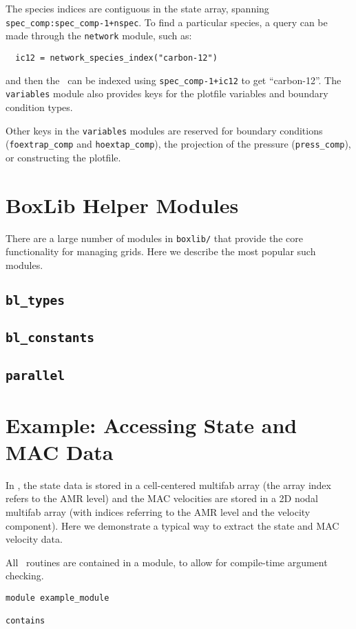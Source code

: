 The species indices are contiguous in the state array, spanning {\tt
  spec\_comp:spec\_comp-1+nspec}.  To find a particular species, a
query can be made through the {\tt network} module, such as:
\begin{verbatim}
  ic12 = network_species_index("carbon-12")
\end{verbatim}
and then the \fab\ can be indexed using {\tt spec\_comp-1+ic12} to
get ``carbon-12''.
The {\tt variables} module also provides keys for the plotfile
variables and boundary condition types.

Other keys in the {\tt variables} modules are reserved for boundary
conditions ({\tt foextrap\_comp} and {\tt hoextap\_comp}), the
projection of the pressure ({\tt press\_comp}), or constructing
the plotfile.


\section{BoxLib Helper Modules}

There are a large number of modules in {\tt boxlib/} that provide
the core functionality for managing grids.  Here we describe
the most popular such modules.


\subsection{{\tt bl\_types}}

\subsection{{\tt bl\_constants}}

\subsection{{\tt parallel}}

\section{\label{sec:example} Example: Accessing State and MAC Data}

In \maestro, the state data is stored in a cell-centered multifab array
(the array index refers to the AMR level) and the MAC velocities are
stored in a 2D nodal multifab array (with indices referring to the AMR
level and the velocity component).  Here we demonstrate a typical way
to extract the state and MAC velocity data.

All \maestro\ routines are contained in a module, to allow for compile-time
argument checking.
\begin{lstlisting}[language={[95]fortran},mathescape=false]
module example_module

contains
\end{lstlisting}


